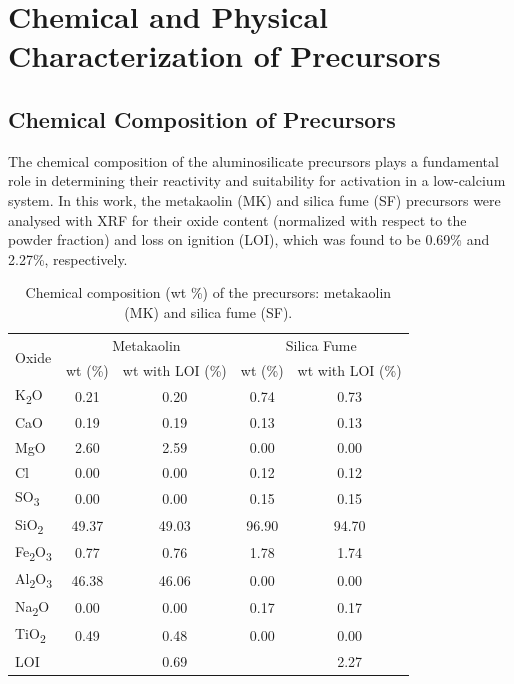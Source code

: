 \section{Chemical and Physical Characterization of Precursors}
\label{sec:chemical_and_physical_characterization_of_precursors}

\subsection{Chemical Composition of Precursors}
\label{sec:chemical_composition_of_precursors}

The chemical composition of the aluminosilicate precursors plays a fundamental role in determining their reactivity and suitability for activation in a low-calcium system. 
In this work, the metakaolin (MK) and silica fume (SF) precursors were analysed with XRF for their oxide content (normalized with respect to the powder fraction) and loss on ignition (LOI), which was found to be 0.69\% and 2.27\%, respectively.

\begin{table}[H]
    \centering
    \caption{Chemical composition (wt \%) of the precursors: metakaolin (MK) and silica fume (SF).}
    \label{tab:xrf_mk_sf}
    \begin{tabular}{l c c c c}
        \hline
        \multirow{2}{*}{Oxide} & \multicolumn{2}{c}{Metakaolin} & \multicolumn{2}{c}{Silica Fume} \\
        \cline{2-5}
        & wt (\%) & wt with LOI (\%) & wt (\%) & wt with LOI (\%) \\
        \hline
        K\textsubscript{2}O & 0.21 & 0.20 & 0.74 & 0.73 \\
        CaO & 0.19  & 0.19 & 0.13 & 0.13 \\
        MgO & 2.60 & 2.59 & 0.00 & 0.00 \\
        Cl & 0.00 & 0.00 & 0.12 & 0.12 \\
        SO\textsubscript{3} & 0.00 & 0.00 & 0.15 & 0.15 \\
        SiO\textsubscript{2} & 49.37 & 49.03 & 96.90 & 94.70 \\
        Fe\textsubscript{2}O\textsubscript{3} & 0.77 & 0.76 & 1.78 & 1.74 \\
        Al\textsubscript{2}O\textsubscript{3} & 46.38 & 46.06 & 0.00 & 0.00 \\
        Na\textsubscript{2}O & 0.00 & 0.00 & 0.17 & 0.17 \\
        TiO\textsubscript{2} & 0.49 & 0.48 & 0.00 & 0.00 \\
        LOI &  & 0.69 &  & 2.27 \\
        \hline
    \end{tabular}
\end{table}


